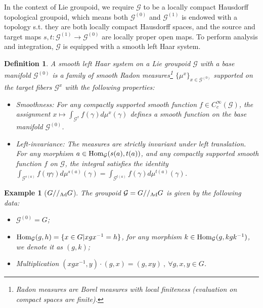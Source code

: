 \documentclass[a4paper,11pt]{article}
\newtheorem{defn}[lemma]{Definition}
\newtheorem{exm}[lemma]{Example}
\def\CG{\mathcal{G}}
\begin{document}
In the context of Lie groupoid, we require $\mathcal{G}$ to be a locally compact Hausdorff topological groupoid, which means both $\CG^{(0)}$ and $\CG^{(1)}$ is endowed with a topology s.t. they are both locally compact Hausdorff spaces, and the source and target maps $s,t:\CG^{(1)}\to \CG^{(0)}$ are locally proper open maps.  To perform analysis and integration, $\mathcal{G}$ is equipped with a smooth left Haar system. 
\begin{defn}
    A smooth left Haar system on a Lie groupoid $\mathcal{G}$ with a base manifold $\CG^{(0)}$ is a family of smooth Radon measures\footnote{Radon measures are Borel measures with local finiteness (evaluation on compact spaces are finite).} $\{\mu^x\}_{x \in \CG^{(0)}}$ supported on the target fibers $\mathcal{G}^x$ with the following properties:
\begin{itemize}
    \item Smoothness: For any compactly supported smooth function $f \in C_c^\infty(\mathcal{G})$, the assignment $x \mapsto \int_{\mathcal{G}^x} f(\gamma) d\mu^x(\gamma)$ defines a smooth function on the base manifold $\CG^{(0)}$.
    \item Left-invariance: The measures are strictly invariant under left translation. For any morphism $a \in {\rm Hom}_{\CG}(s(a),t(a))$, and any compactly supported smooth function $f$ on $\CG$, the integral satisfies the identity $\int_{\mathcal{G}^{s(a)}} f(\eta \gamma) d\mu^{s(a)}(\gamma) = \int_{\mathcal{G}^{t(a)}} f(\gamma) d\mu^{t(a)}(\gamma)$.
\end{itemize}
\end{defn}

\begin{exm}[$G//_{\rm Ad}G$]
    The groupoid $\CG = G//_{\rm Ad}G$ is given by the following data:
    \begin{itemize}
        \item $\CG^{(0)} = G$;
        \item ${\rm Hom}_{\CG}(g,h) = \{ x\in G| xgx^{-1} = h \}$, for any morphism $k\in {\rm Hom}_{\CG}(g,kgk^{-1})$, we denote it as $(g,k)$;
        \item Multiplication $(xgx^{-1},y)\cdot (g,x) = (g,xy) \ , \ \forall g,x,y\in G$.
    \end{itemize}
\end{exm}
\end{document}
